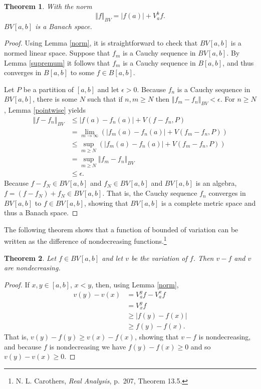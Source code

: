 \documentclass{article}
\newcommand{\norm}[1]{\left\Vert #1 \right\Vert}
\newtheorem{theorem}{Theorem}
\theoremstyle{definition}
\begin{document}
\begin{theorem}
With the norm
\[
\norm{f}_{BV} = |f(a)| + V_a^b f.
\]
$BV[a,b]$ is a Banach space.
\end{theorem}
\begin{proof}
Using Lemma \ref{norm}, it is straightforward to check that $BV[a,b]$ is a normed linear space.
Suppose that $f_m$ is a Cauchy sequence
in $BV[a,b]$. By Lemma \ref{supremum} it follows that $f_m$ is a Cauchy sequence in $B[a,b]$, and thus converges
in $B[a,b]$ to some $f \in B[a,b]$.  

Let $P$ be a partition of $[a,b]$ and let $\epsilon>0$. Because $f_n$ is a Cauchy sequence in $BV[a,b]$, there is some
$N$ such that if $n,m \geq N$ then $\norm{f_m-f_n}_{BV} < \epsilon$. 
For $n \geq N$, Lemma \ref{pointwise} yields
\begin{align*}
\norm{f-f_n}_{BV}&\leq |f(a)-f_n(a)|+V(f-f_n,P)\\
&=\lim_{m \to \infty} \left( |f_m(a)-f_n(a)|+V(f_m-f_n,P)\right)\\
&\leq \sup_{m \geq N}  \left( |f_m(a)-f_n(a)|+V(f_m-f_n,P)\right)\\
&=\sup_{m \geq N} \norm{f_m-f_n}_{BV}\\
&\leq \epsilon.
\end{align*}
Because $f-f_N \in BV[a,b]$ and $f_N \in BV[a,b]$ and
$BV[a,b]$ is an algebra, $f=(f-f_N)+f_N \in BV[a,b]$. That is, the Cauchy sequence $f_n$ converges
in $BV[a,b]$ to $f \in BV[a,b]$, showing that $BV[a,b]$ is a complete metric space and thus a Banach space.
\end{proof}


The following theorem shows that a function of bounded of variation can be written as the difference
of nondecreasing functions.\footnote{N. L. Carothers, {\em Real Analysis}, p.~207, Theorem 13.5.}

\begin{theorem}
Let $f \in BV[a,b]$ and let $v$ be the variation of $f$.
Then $v-f$ and $v$ are nondecreasing.
\label{vnondecreasing}
\end{theorem}
\begin{proof}
If $x,y \in [a,b]$, $x<y$, then, using Lemma \ref{norm},
\begin{align*}
v(y)-v(x)&=V_a^y f - V_a^x f\\
&=V_x^y f\\
&\geq |f(y)-f(x)|\\
&\geq f(y)-f(x).
\end{align*}
That is, $v(y)-f(y) \geq v(x)-f(x)$, showing that $v-f$ is nondecreasing, and
because $f$ is nondecreasing we have $f(y) - f(x) \geq 0$ and so $v(y) - v(x) \geq 0$.
\end{proof}
\end{document}

